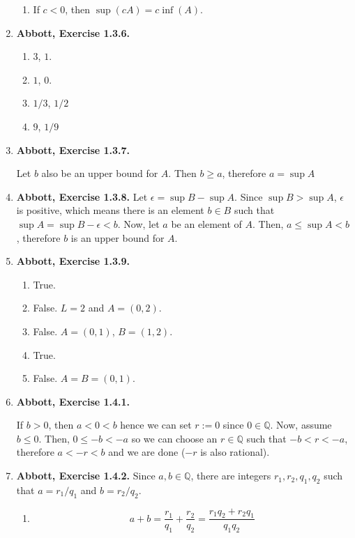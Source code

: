 \documentclass{article}
\newcommand{\Q}{\mathbb{Q}}
\newcommand{\exc}[2][Abbott]{\item \textbf{#1, Exercise #2.}}
\begin{document}
\begin{enumerate}
\begin{enumerate}
		\item If $c < 0$, then $\sup(c A) = c\inf(A)$.
	\end{enumerate}
				      	      
	\exc{1.3.6}
				      	      
	\begin{enumerate}
		\item $3$, $1$.
		\item $1$, $0$.
		\item $1/3$, $1/2$
		\item $9$, $1/9$
	\end{enumerate}
				      	      
	\exc{1.3.7}
				      	      
	Let $b$ also be an upper bound for $A$. Then $b \geq a$, therefore $a = \sup A$
				      	      
	\exc{1.3.8}
	Let $\epsilon = \sup B - \sup A$. Since $\sup B > \sup A$, $\epsilon$ is positive, which means there is an element $b \in B$ such that $\sup A = \sup B - \epsilon < b$. Now, let $a$ be an element of $A$. Then, $a \leq \sup A < b$, therefore $b$ is an upper bound for $A$.
				      	      
	\exc{1.3.9}
	\begin{enumerate}
		\item True.
		\item False. $L = 2$ and $A = (0, 2)$.
		\item False. $A = (0, 1)$, $B = (1, 2).$
		\item True.
		\item False. $A = B = (0, 1).$
	\end{enumerate}
				      	       
	\exc{1.4.1}
				      	       
	If $b > 0$, then $a < 0 < b$ hence we can set $r := 0$ since $0 \in \Q$. Now, assume $b \leq 0$. Then, $0 \leq -b < -a$ so we can choose an $r \in \Q$ such that $-b < r < -a$, therefore $a < -r < b$ and we are done ($-r$ is also rational). 
				      	       
	\exc{1.4.2}
	Since $a,b \in \Q$, there are integers $r_1, r_2, q_1,q_2$ such that $a = r_1/q_1$ and $b = r_2/q_2$.
				      	        
	\begin{enumerate}
		\item \begin{equation*}
		      a + b = \frac{r_1}{q_1} + \frac{r_2}{q_2} = \frac{r_1 q_2 + r_2 q_1}{q_1 q_2} 
		\end{equation*}
							      		      	      

\end{enumerate}
\end{enumerate}
\end{document}
